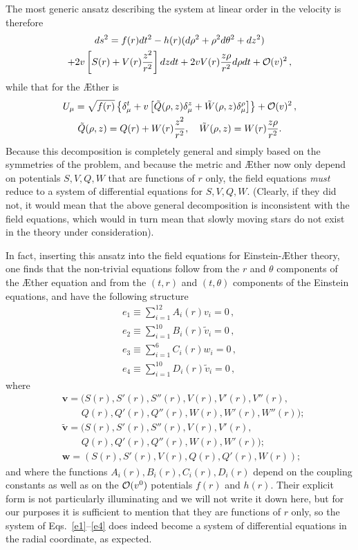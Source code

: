 \documentclass[prd,aps,twocolumn,nofootinbib,showpacs,superscriptaddress]{revtex4-1}
\begin{document}
The most generic ansatz describing the system at linear order in the
velocity is therefore
\begin{multline}
ds^2 = f(r) dt^2 - h(r) (d\rho^2 + \rho^2 d\theta^2+dz^2)\\+ 2 v
\left[S(r)+V(r) \frac{z^2}{r^2}\right]dz dt+ 2v  V(r)\frac{z\rho}{r^2}
d\rho dt +{\cal O}(v)^2\,, 
\end{multline}
while that for the \AE ther is 
\begin{gather}
\label{U-ansatz}
U_\mu = \sqrt{f(r)} \left\{ \delta_\mu^t +
v\left[\tilde{Q}(\rho,z)\delta_\mu^z+ \tilde{W}(\rho,z)
  \delta_\mu^\rho\right]\right\} +{\cal
  O}(v)^2\,,\\ \tilde{Q}(\rho,z)=Q(r)+W(r)\frac{z^2}{r^2},\quad \tilde{W}(\rho,z)=
W(r) \frac{z\rho}{r^2}.
\end{gather}
%
Because this decomposition is completely general and simply based on
the symmetries of the problem, and because the metric and \AE ther now
only depend on potentials $S,V,Q,W$ that are functions of $r$ only,
the field equations \textit{must} reduce to a system of differential
equations for $S,V,Q,W$.  (Clearly, if they did not, it would mean
that the above general decomposition is inconsistent with the field
equations, which would in turn mean that slowly moving stars do not
exist in the theory under consideration).

In fact, inserting this ansatz into the field equations for
 Einstein-\AE ther theory, one finds that the non-trivial equations  follow from the
$r$ and $\theta$ components of the \AE ther equation  and from the $(t,r)$
and $(t,\theta)$ components of the Einstein equations,  and have the
following structure
\begin{gather}
e_1\equiv\sum_{i=1}^{12}A_i(r)
v_i=0\label{e1}\,,\\ e_2\equiv\sum_{i=1}^{10}B_i(r)
\tilde{v}_i=0\label{e2}\,,\\ e_3\equiv\sum_{i=1}^{6}C_i(r)
w_i=0\label{e3}\,,\\ e_4\equiv\sum_{i=1}^{10}D_i(r)
\tilde{v}_i=0\label{e4}\,,
\end{gather}
where 
\begin{align}
&\boldsymbol{v}=(S(r),S'(r),S''(r),V(r),V'(r),V''(r),\nonumber\\&
  \qquad
  Q(r),Q'(r),Q''(r),W(r),W'(r),W''(r));\\
   &\boldsymbol{\tilde{v}}=(S(r),S'(r),S''(r),V(r),V'(r),\nonumber\\ &
  \qquad Q(r),Q'(r),Q''(r),W(r),W'(r));\\
   &\boldsymbol{w}=(S(r),S'(r),
  V(r), Q(r),Q'(r),W(r));
\end{align}
and where the functions $A_i(r),B_i(r),C_i(r), D_i(r)$ depend on the
coupling constants as well as on the ${\cal O} (v^0)$ potentials
$f(r)$ and $h(r)$. Their explicit form is not particularly
illuminating and we will not write it down here, but for our purposes
it is sufficient to mention that they are functions of $r$ only, so
the system of Eqs.~\eqref{e1}--\eqref{e4} does indeed become a system of
differential equations in the radial coordinate, as expected.
\end{document}
